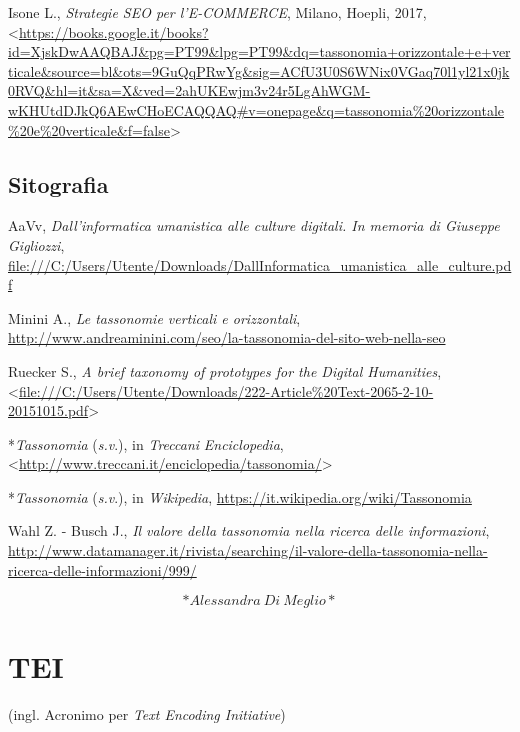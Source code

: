 \documentclass[
  b5paper,
  twoside,
  12pt,
  chapterprefix=false,
  bibliography=totocnumbered,
  parskip=false]{scrbook}
\begin{document}
Isone L., \emph{Strategie SEO per l'E-COMMERCE}, Milano, Hoepli, 2017,
\textless{}{\url{https://books.google.it/books?id=XjskDwAAQBAJ\&pg=PT99\&lpg=PT99\&dq=tassonomia+orizzontale+e+verticale\&source=bl\&ots=9GuQqPRwYg\&sig=ACfU3U0S6WNix0VGaq70l1yl21x0jk0RVQ\&hl=it\&sa=X\&ved=2ahUKEwjm3v24r5LgAhWGM-wKHUtdDJkQ6AEwCHoECAQQAQ\#v=onepage\&q=tassonomia\%20orizzontale\%20e\%20verticale\&f=false}\textgreater{}}

\hypertarget{sitografia-30}{%
\section*{Sitografia}\label{sitografia-30}}

AaVv, \emph{Dall'informatica umanistica alle culture digitali. In memoria di
Giuseppe Gigliozzi},
\url{file:///C:/Users/Utente/Downloads/DallInformatica_umanistica_alle_culture.pdf}

Minini A., \emph{Le tassonomie verticali e orizzontali},
\url{http://www.andreaminini.com/seo/la-tassonomia-del-sito-web-nella-seo}

Ruecker S., \emph{A brief taxonomy of prototypes for the Digital Humanities},
\textless{}{\href{file:///C:/Users/Utente/Downloads/222-Article\%20Text-2065-2-10-20151015.pdf}{file:///C:/Users/Utente/Downloads/222-Article\%20Text-2065-2-10-20151015.pdf}\textgreater{}}

*\emph{Tassonomia} (\emph{s.v}.), in \emph{Treccani} \emph{Enciclopedia},
\textless{}\href{http://www.treccani.it/enciclopedia/tassonomia/}{{http://www.treccani.it/enciclopedia/tassonomia/}}\textgreater{}

*\emph{Tassonomia} (\emph{s.v}.), in \emph{Wikipedia},
\url{https://it.wikipedia.org/wiki/Tassonomia}

Wahl Z. - Busch J., \emph{Il valore della tassonomia nella ricerca delle
informazioni},
\url{http://www.datamanager.it/rivista/searching/il-valore-della-tassonomia-nella-ricerca-delle-informazioni/999/}

\[*Alessandra~Di~Meglio*\]

\hypertarget{tei}{%
\chapter{TEI}\label{tei}}

(ingl. Acronimo per \emph{Text Encoding Initiative})
\end{document}

